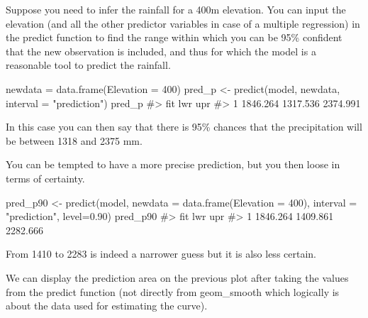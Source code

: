 \documentclass[
  letterpaper,
  DIV=11,
  numbers=noendperiod]{scrreprt}
\newenvironment{Shaded}{\begin{snugshade}}{\end{snugshade}}
\newcommand{\AttributeTok}[1]{\textcolor[rgb]{0.40,0.45,0.13}{#1}}
\newcommand{\CommentTok}[1]{\textcolor[rgb]{0.37,0.37,0.37}{#1}}
\newcommand{\DecValTok}[1]{\textcolor[rgb]{0.68,0.00,0.00}{#1}}
\newcommand{\FloatTok}[1]{\textcolor[rgb]{0.68,0.00,0.00}{#1}}
\newcommand{\FunctionTok}[1]{\textcolor[rgb]{0.28,0.35,0.67}{#1}}
\newcommand{\NormalTok}[1]{\textcolor[rgb]{0.00,0.23,0.31}{#1}}
\newcommand{\OtherTok}[1]{\textcolor[rgb]{0.00,0.23,0.31}{#1}}
\newcommand{\StringTok}[1]{\textcolor[rgb]{0.13,0.47,0.30}{#1}}
\begin{document}
Suppose you need to infer the rainfall for a 400m elevation. You can
input the elevation (and all the other predictor variables in case of a
multiple regression) in the predict function to find the range within
which you can be 95\% confident that the new observation is included,
and thus for which the model is a reasonable tool to predict the
rainfall.

\begin{Shaded}
\begin{Highlighting}[]
\NormalTok{newdata }\OtherTok{=} \FunctionTok{data.frame}\NormalTok{(}\AttributeTok{Elevation =} \DecValTok{400}\NormalTok{)}
\NormalTok{pred\_p }\OtherTok{\textless{}{-}} \FunctionTok{predict}\NormalTok{(model, newdata, }\AttributeTok{interval =} \StringTok{"prediction"}\NormalTok{)}
\NormalTok{pred\_p}
\CommentTok{\#\textgreater{}        fit      lwr      upr}
\CommentTok{\#\textgreater{} 1 1846.264 1317.536 2374.991}
\end{Highlighting}
\end{Shaded}

In this case you can then say that there is 95\% chances that the
precipitation will be between 1318 and 2375 mm.

You can be tempted to have a more precise prediction, but you then loose
in terms of certainty.

\begin{Shaded}
\begin{Highlighting}[]
\NormalTok{pred\_p90 }\OtherTok{\textless{}{-}} \FunctionTok{predict}\NormalTok{(model, }\AttributeTok{newdata =} \FunctionTok{data.frame}\NormalTok{(}\AttributeTok{Elevation =} \DecValTok{400}\NormalTok{), }\AttributeTok{interval =} \StringTok{"prediction"}\NormalTok{, }\AttributeTok{level=}\FloatTok{0.90}\NormalTok{)}
\NormalTok{pred\_p90}
\CommentTok{\#\textgreater{}        fit      lwr      upr}
\CommentTok{\#\textgreater{} 1 1846.264 1409.861 2282.666}
\end{Highlighting}
\end{Shaded}

From 1410 to 2283 is indeed a narrower guess but it is also less
certain.

We can display the prediction area on the previous plot after taking the
values from the predict function (not directly from geom\_smooth which
logically is about the data used for estimating the curve).
\end{document}
